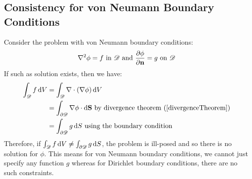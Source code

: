 \documentclass[../main.tex]{subfiles}
\begin{document}
\subsection{Consistency for von Neumann Boundary Conditions}
\nonexaminable
Consider the problem with von Neumann boundary conditions:
\[
  \nabla^2 \phi = f \text{ in } \mathscr{D} \text{ and } \pderiv{\phi}{\vec{n}} = g \text{ on } \mathscr{D}
\]
If such as solution exists, then we have:
\begin{align*}
  \int_{\mathscr{D}} f \d{V} &= \int_{\mathscr{D}} \nabla \cdot (\nabla \phi) \d{V} \\
                             &= \int_{\partial \mathscr{D}} \nabla \phi \cdot \d{\vec{S}} \text{ by divergence theorem (\cref{divergenceTheorem})}\\
                             &= \int_{\partial \mathscr{D}} g \d{S} \text{ using the boundary condition}
\end{align*}
Therefore, if $\int_{\mathscr{D}} f \d{V} \neq \int_{\partial \mathscr{D}} g \d{S}$, the problem is ill-posed and so there is no solution for $\phi$.
This means for von Neumann boundary conditions, we cannot just specify any function $g$ whereas for Dirichlet boundary conditions, there are no such constraints.
\end{document}
